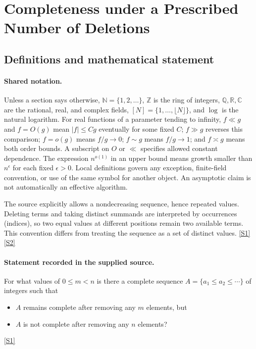 \documentclass[11pt,a4paper]{article}
\newcommand{\N}{\mathbb{N}}
\newcommand{\Z}{\mathbb{Z}}
\newcommand{\Q}{\mathbb{Q}}
\newcommand{\R}{\mathbb{R}}
\newcommand{\C}{\mathbb{C}}
\newcommand{\sref}[2]{\hyperlink{source:#1:#2}{[S#2]}}
\begin{document}
\section{Completeness under a Prescribed Number of Deletions}\label{statement}


\subsection{Definitions and mathematical statement}

\paragraph{Shared notation.}Unless a section says otherwise, $\N=\{1,2,\ldots\}$,
$\Z$ is the ring of integers, $\Q,\R,\C$ are the rational, real, and complex
fields, $[N]=\{1,\ldots,\lfloor N\rfloor\}$, and $\log$ is the natural
logarithm. For real functions of a parameter tending to infinity,
$f\ll g$ and $f=O(g)$ mean $|f|\leq Cg$ eventually for some fixed $C$;
$f\gg g$ reverses this comparison; $f=o(g)$ means $f/g\to0$;
$f\sim g$ means $f/g\to1$; and $f\asymp g$ means both order bounds.
A subscript on $O$ or $\ll$ specifies allowed constant dependence.
The expression $n^{o(1)}$ in an upper bound means growth smaller than
$n^\epsilon$ for each fixed $\epsilon>0$. Local definitions govern any
exception, finite-field convention, or use of the same symbol for another
object. An asymptotic claim is not automatically an effective algorithm.



The source explicitly allows a nondecreasing sequence, hence repeated values. Deleting terms and taking distinct summands are interpreted by occurrences (indices), so two equal values at different positions remain two available terms. This convention differs from treating the sequence as a set of distinct values. \sref{statement}{1} \sref{statement}{2}

\paragraph{Statement recorded in the supplied source.}
For what values of $0\leq m<n$ is there a complete sequence $A=\{a_1\leq a_2\leq \cdots\}$ of integers such that
\begin{itemize}
\item  $A$ remains complete after removing any $m$ elements, but 
\item  $A$ is not complete after removing any $n$ elements? 
\end{itemize} \sref{statement}{1}
\end{document}
